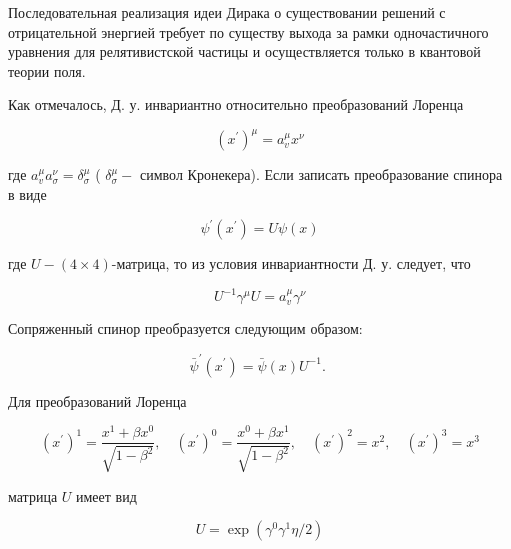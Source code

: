 \documentclass[10pt]{article}
\begin{document}
Последовательная реализация идеи Дирака о существовании решений с отрицательной энергией требует по существу выхода за рамки одночастичного уравнения для релятивистской частицы и осуществляется только в квантовой теории поля.



Как отмечалось, Д. у. инвариантно относительно преобразований Лоренца



\[

\left(x^{\prime}\right)^{\mu}=a_{v}^{\mu} x^{\nu}

\]



где $a_{v}^{\mu} a_{\sigma}^{\nu}=\delta_{\sigma}^{\mu}$ ( $\delta_{\sigma}^{\mu}-$ символ Кронекера). Если записать преобразование спинора в виде



\[

\psi^{\prime}\left(x^{\prime}\right)=U \psi(x)

\]



где $U-(4 \times 4)$-матрица, то из условия инвариантности Д. у. следует, что



\[

U^{-1} \gamma^{\mu} U=a_{v}^{\mu} \gamma^{\nu}

\]



Сопряженный спинор преобразуется следующим образом:



\[

\bar{\psi}^{\prime}\left(x^{\prime}\right)=\bar{\psi}(x) U^{-1} \text {. }

\]



Для преобразований Лоренца



\[

\left(x^{\prime}\right)^{1}=\frac{x^{1}+\beta x^{0}}{\sqrt{1-\beta^{2}}}, \quad\left(x^{\prime}\right)^{0}=\frac{x^{0}+\beta x^{1}}{\sqrt{1-\beta^{2}}}, \quad\left(x^{\prime}\right)^{2}=x^{2}, \quad\left(x^{\prime}\right)^{3}=x^{3}

\]



матрица $U$ имеет вид



\[

U=\exp \left(\gamma^{0} \gamma^{1} \eta / 2\right)

\]
\end{document}

